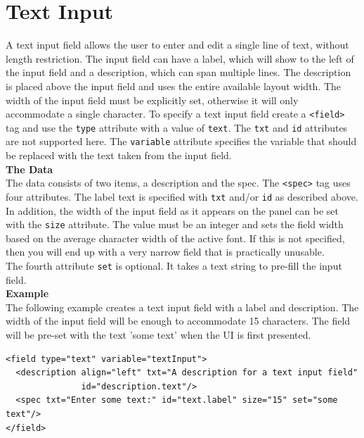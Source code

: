 \section{Text Input}

A text input field allows the user to enter and edit a single line of
text, without length restriction. The input field can have a label,
which will show to the left of the input field and a description, which
can span multiple lines. The description is placed above the input field
and uses the entire available layout width. The width of the input field
must be explicitly set, otherwise it will only accommodate a single
character. To specify a text input field create a \texttt{<field>} tag
and use the \texttt{type} attribute with a value of \texttt{text}. The
\texttt{txt} and \texttt{id} attributes are not supported here. The
\texttt{variable} attribute specifies the variable that should be
replaced with the text taken from the input field.\\

\textbf{The Data}\\

The data consists of two items, a description and the spec. The
\texttt{<spec>} tag uses four attributes. The label text is specified with
\texttt{txt} and/or \texttt{id} as described above. In addition, the
width of the input field as it appears on the panel can be set with the
\texttt{size} attribute. The value must be an integer and sets the field
width based on the average character width of the active font. If this
is not specified, then you will end up with a very narrow field that is
practically unusable.\\

The fourth attribute \texttt{set} is optional. It takes a text string to
pre-fill the input field.\\

\textbf{Example}\\

The following example creates a text input field with a label and
description. The width of the input field will be enough to accommodate
15 characters. The field will be pre-set with the text 'some text' when
the UI is first presented.\\

\footnotesize
\begin{verbatim}
<field type="text" variable="textInput">
  <description align="left" txt="A description for a text input field"
               id="description.text"/>
  <spec txt="Enter some text:" id="text.label" size="15" set="some text"/>
</field>
\end{verbatim}
\normalsize

